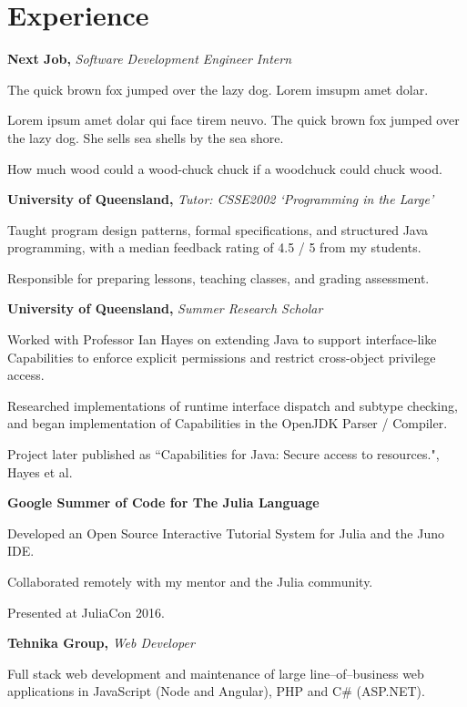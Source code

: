 \documentclass[a4paper]{article}
\renewenvironment{itemize}{
  \begin{list}{}{
    \setlength{\leftmargin}{1.5em}
  }
}{
  \end{list}
}
\newcommand{\dateitem}[1] {\item[\textbf{#1 :}]}
\newcommand{\accentcolour}{\color{darkgray}}
\newcommand{\resumesection}[1]{\section*{\accentcolour #1}}
\newcommand{\resumeitem}[4]{
	\dateitem{#1} {\textbf{#2,} {\bfseries\accentcolour#3}
		
		#4
	}	
}
\renewcommand{\accentcolour}{\color{NavyBlue}}
\renewcommand{\resumesection}[1]{\section*{\accentcolour #1}}
\renewcommand{\resumeitem}[4]{
	\dateitem{#1} {\textbf{#2,} \textit{#3}
		
		#4
	}	
}
\begin{document}
\resumesection{Experience}
\begin{itemize}
	\resumeitem{2018 -- 2019}{Next Job}{Software Development Engineer Intern}{
		The quick brown fox jumped over the lazy dog. Lorem imsupm amet dolar.
		
		Lorem ipsum amet dolar qui face tirem neuvo. The quick brown fox jumped over the lazy dog. She sells sea shells by the sea shore.
		
		How much wood could a wood-chuck chuck if a woodchuck could chuck wood. 
	}
	
	\resumeitem{2017}{University of Queensland}{Tutor: CSSE2002 `Programming in the Large'}{		
		Taught program design patterns, formal specifications, and structured Java programming, with a median feedback rating of 4.5 / 5 from my students.
		
		Responsible for preparing lessons, teaching classes, and grading assessment.
	}

	\resumeitem{2016 -- 2017}{University of Queensland}{Summer Research Scholar}{		
		Worked with Professor Ian Hayes on extending Java to support interface-like Capabilities to enforce explicit permissions and restrict cross-object privilege access.
		
		Researched implementations of runtime interface dispatch and subtype checking, and began implementation of Capabilities in the OpenJDK Parser / Compiler.
		
		Project later published as ``Capabilities for Java: Secure access to resources.", Hayes et al.
	}

	\dateitem{2016}{\textbf{Google Summer of Code for The Julia Language}
		
		Developed an Open Source Interactive Tutorial System for Julia and the Juno IDE.
		
		Collaborated remotely with my mentor and the Julia community.
		
		Presented at JuliaCon 2016.
	}
	
	\resumeitem{2014 -- 2016}{Tehnika Group}{Web Developer}{		
		Full stack web development and maintenance of large line--of--business web applications in JavaScript (Node and Angular), PHP and C\# (ASP.NET).
	}
	
	
\end{itemize}
\end{document}
